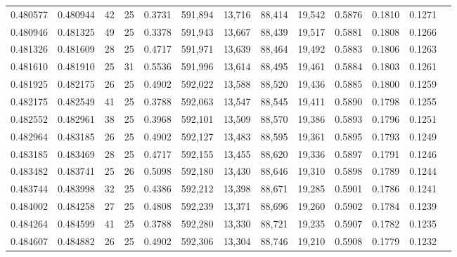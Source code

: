 \begin{tabular}{rrrrrrrrrrrrr}
0.480577 & 0.480944 &    42 &  25 &                                     0.3731 & 591,894 &  13,716 &  88,414 &  19,542 & 0.5876 & 0.1810 & 0.1271 \\
0.480946 & 0.481325 &    49 &  25 &                                     0.3378 & 591,943 &  13,667 &  88,439 &  19,517 & 0.5881 & 0.1808 & 0.1266 \\
0.481326 & 0.481609 &    28 &  25 &                                     0.4717 & 591,971 &  13,639 &  88,464 &  19,492 & 0.5883 & 0.1806 & 0.1263 \\
0.481610 & 0.481910 &    25 &  31 &                                     0.5536 & 591,996 &  13,614 &  88,495 &  19,461 & 0.5884 & 0.1803 & 0.1261 \\
0.481925 & 0.482175 &    26 &  25 &                                     0.4902 & 592,022 &  13,588 &  88,520 &  19,436 & 0.5885 & 0.1800 & 0.1259 \\
0.482175 & 0.482549 &    41 &  25 &                                     0.3788 & 592,063 &  13,547 &  88,545 &  19,411 & 0.5890 & 0.1798 & 0.1255 \\
0.482552 & 0.482961 &    38 &  25 &                                     0.3968 & 592,101 &  13,509 &  88,570 &  19,386 & 0.5893 & 0.1796 & 0.1251 \\
0.482964 & 0.483185 &    26 &  25 &                                     0.4902 & 592,127 &  13,483 &  88,595 &  19,361 & 0.5895 & 0.1793 & 0.1249 \\
0.483185 & 0.483469 &    28 &  25 &                                     0.4717 & 592,155 &  13,455 &  88,620 &  19,336 & 0.5897 & 0.1791 & 0.1246 \\
0.483482 & 0.483741 &    25 &  26 &                                     0.5098 & 592,180 &  13,430 &  88,646 &  19,310 & 0.5898 & 0.1789 & 0.1244 \\
0.483744 & 0.483998 &    32 &  25 &                                     0.4386 & 592,212 &  13,398 &  88,671 &  19,285 & 0.5901 & 0.1786 & 0.1241 \\
0.484002 & 0.484258 &    27 &  25 &                                     0.4808 & 592,239 &  13,371 &  88,696 &  19,260 & 0.5902 & 0.1784 & 0.1239 \\
0.484264 & 0.484599 &    41 &  25 &                                     0.3788 & 592,280 &  13,330 &  88,721 &  19,235 & 0.5907 & 0.1782 & 0.1235 \\
0.484607 & 0.484882 &    26 &  25 &                                     0.4902 & 592,306 &  13,304 &  88,746 &  19,210 & 0.5908 & 0.1779 & 0.1232 \\

\end{tabular}
